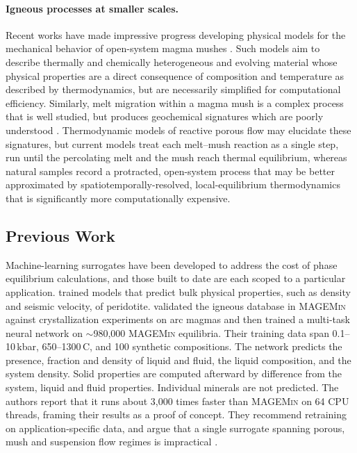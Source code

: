 \paragraph{Igneous processes at smaller scales.} Recent works have made impressive progress developing physical models for the mechanical behavior of open-system magma mushes \citep{bergantz2015}. 
Such models aim to describe thermally and chemically heterogeneous and evolving material whose physical properties are a direct consequence of composition and temperature as
described by thermodynamics, but are necessarily simplified for computational efficiency. Similarly, melt migration within a magma mush is a complex process that is well studied, 
but produces geochemical signatures which are poorly understood \citep{ohara1981,lesher1988,maier2020,yao2021}. Thermodynamic models of reactive porous 
flow may elucidate these signatures, but current models treat each melt--mush reaction as a single step, run until the percolating melt and the mush reach thermal equilibrium, 
whereas natural samples record a protracted, open-system process \citep{boulanger2023} that may be better approximated by spatiotemporally-resolved, local-equilibrium thermodynamics that 
is significantly more computationally expensive.

\subsection{Previous Work}\label{ch4-prev-work}

Machine-learning surrogates have been developed to address the cost of phase equilibrium calculations, and those built to date
are each scoped to a particular application. \citet{kerswell2024} trained models that predict bulk physical properties, such as
density and seismic velocity, of peridotite. \citet{candioti2026} validated the \citet{holland2018} igneous database in
\textsc{MAGEMin} against crystallization experiments on arc magmas and then trained a multi-task neural network on
$\sim$980{,}000 \textsc{MAGEMin} equilibria. Their training data span 0.1--10\,kbar, 650--1300\,\textdegree C, and 100 synthetic
compositions. The network predicts the presence, fraction and
density of liquid and fluid, the liquid composition, and the system density. Solid properties are computed afterward by difference
from the system, liquid and fluid properties. Individual minerals are not predicted. The authors report that it runs about 3{,}000 times 
faster than \textsc{MAGEMin} on 64 CPU threads, framing their results as a proof of concept. They recommend retraining on application-specific data, 
and argue that a single surrogate spanning porous, mush and suspension flow regimes is impractical \citep{candioti2026}.

